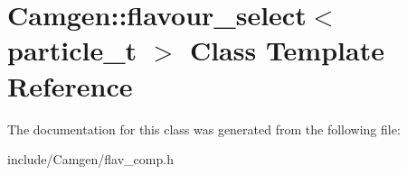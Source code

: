 \hypertarget{a00229}{\section{Camgen\-:\-:flavour\-\_\-select$<$ particle\-\_\-t $>$ Class Template Reference}
\label{a00229}
}


The documentation for this class was generated from the following file\-:\begin{DoxyCompactItemize}
\item 
include/\-Camgen/flav\-\_\-comp.\-h\end{DoxyCompactItemize}
